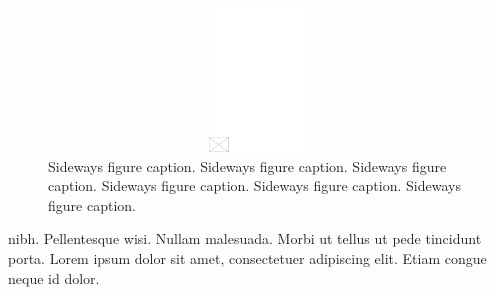 \documentclass[AMA,STIX1COL]{WileyNJD-SP}
\begin{document}
\begin{figure}
\centerline{\includegraphics[width=542pt,height=9pc,draft]{empty}}
\caption{Sideways figure caption. Sideways figure caption. Sideways figure caption. Sideways figure caption. Sideways figure caption. Sideways figure caption.\label{fig3}}
\end{figure}

nibh. Pellentesque wisi.\cite{Kucharik2012} Nullam malesuada. Morbi ut tellus ut pede tincidunt porta. Lorem ipsum dolor sit amet,
consectetuer adipiscing elit. Etiam congue neque id dolor.
\end{document}
